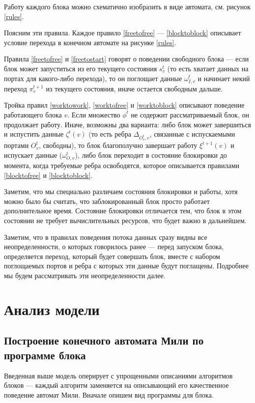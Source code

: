 \documentclass[10pt,a4paper]{article}
\begin{document}
Работу каждого блока можно схематично изобразить в виде автомата, см. рисунок \ref{rules}.

Поясним эти правила. Каждое правило \eqref{freetofree} --- \eqref{blocktoblock} описывает условие перехода в конечном автомате на рисунке \ref{rules}.

Правила \eqref{freetofree} и \eqref{freetostart} говорят о поведении свободного блока --- если блок может запуститься из его текущего состояния $s^t_v$
(то есть хватает данных на портах для какого-либо перехода), то он поглощает данные $\omega^t_{I, v}$ и
начинает некий переход $\pi^{t+1}_v$ из текущего состояния, иначе остается свободным дальше.

Тройка правил \eqref{worktowork}, \eqref{worktofree} и \eqref{worktoblock} описывают поведение работающего блока $v$. Если множество $\phi^t$ не содержит рассматриваемый блок,
он продолжает работу. Иначе, возможны два варианта: либо блок может завершиться и испустить данные $\zeta^t(v)$ (то есть ребра $\Delta_{O^t_v, v}$, связанные с испускаемыми портами $O^t_v$, свободны), то блок благополучно завершает работу $\xi^{t + 1}(v)$ и испускает данные ($\omega^t_{O, v}$), либо блок переходит в состояние блокировки до момента, когда требуемые ребра освободятся, которое описывается правилами \eqref{blocktofree} и \eqref{blocktoblock}.

Заметим, что мы специально различаем состояния блокировки и работы, хотя можно было бы считать, что заблокированный блок просто работает дополнительное время.
Состояние блокировки отличается тем, что блок в этом состоянии не требует вычислительных ресурсов, что будет важно в дальнейшем.

Заметим, что в правилах поведения потока данных сразу видны все неопределенности, о которых говорилось ранее --- перед запуском блока, определяется переход, который будет совершать блок, вместе с набором поглощаемых портов и ребра с которых эти данные будут поглащены. Подробнее мы будем рассматривать эти неопределенности далее.

\section{Анализ модели}
\subsection{Построение конечного автомата Мили по программе блока}
Введенная выше модель оперирует с упрощенными описаниями алгоритмов блоков --- каждый алгоритм заменяется на описывающий его качественное поведение автомат Мили.
Вначале опишем вид программы для блока.
\end{document}
